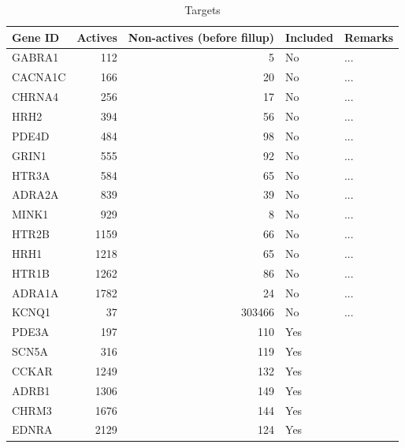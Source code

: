 \documentclass[utf8]{frontiersSCNS} %
\begin{document}
\begin{table}[]
\centering
\caption{Targets}
\label{tbl:targets}
\begin{tabular}{|l|r|r|l|l|}
\hline
    Gene ID & Actives & Non-actives (before fillup) & Included & Remarks \\ \hline
    GABRA1  &       112     &       5           &   No      &       ...     \\
    CACNA1C &       166     &       20          &   No      &       ...     \\
    CHRNA4  &       256     &       17          &   No      &       ...     \\
    HRH2    &       394     &       56          &   No      &       ...     \\
    PDE4D   &       484     &       98          &   No      &       ...     \\
    GRIN1   &       555     &       92          &   No      &       ...     \\
    HTR3A   &       584     &       65          &   No      &       ...     \\
    ADRA2A  &       839     &       39          &   No      &       ...     \\
    MINK1   &       929     &       8           &   No      &       ...     \\
    HTR2B   &       1159    &       66          &   No      &       ...     \\
    HRH1    &       1218    &       65          &   No      &       ...     \\
    HTR1B   &       1262    &       86          &   No      &       ...     \\
    ADRA1A  &       1782    &       24          &   No      &       ...     \\
    KCNQ1   &       37      &       303466      &   No      &       ...     \\
    PDE3A   &       197     &       110         &   Yes     &       \\
    SCN5A   &       316     &       119         &   Yes     &       \\
    CCKAR   &       1249    &       132         &   Yes     &       \\
    ADRB1   &       1306    &       149         &   Yes     &       \\
    CHRM3   &       1676    &       144         &   Yes     &       \\
    EDNRA   &       2129    &       124         &   Yes     &       \\

\end{tabular}
\end{table}
\end{document}
